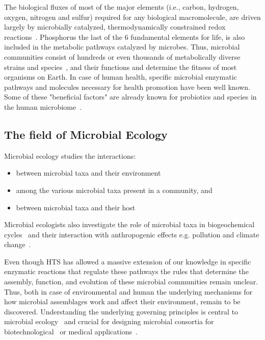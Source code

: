    The biological fluxes of most of the major elements (i.e., carbon, hydrogen, oxygen, nitrogen and sulfur) required
   for any biological macromolecule,
   are driven largely
   by microbially catalyzed, thermodynamically constrained redox reactions~\cite{falkowski2008microbial}. 
   Phosphorus the last of the 6 fundamental elements for life, is also included in the metabolic pathways catalyzed by microbes. 
   Thus, microbial communities consist of hundreds or even thousands of metabolically diverse strains and species~\cite{leventhal2018strain},
   and their functions
   and determine the fitness of most organisms on Earth. 
   In case of human health, specific microbial enzymatic pathways and molecules necessary for health promotion have been well known.
   Some of these "beneficial factors" are already known for probiotics and species in the human microbiome~\cite{marco2021defining}.


   \subsection{The field of Microbial Ecology}
   Microbial ecology studies the interactions: 
   \begin{itemize}
      \setlength\itemsep{0.05em}
      \item between microbial taxa and their environment
      \item among the various microbial taxa present in a community, and
      \item between microbial taxa and their host~\cite{isme}
   \end{itemize}

   Microbial ecologists also investigate the role of microbial taxa in 
   biogeochemical cycles~\cite{falkowski2008microbial} and their interaction 
   with anthropogenic effects e.g. pollution and climate change~\cite{cavicchioli2019scientists}.

   Even though HTS has allowed a massive extension of our knowledge in  
   specific enzymatic reactions that regulate these pathways the rules that determine 
   the assembly, function, and evolution of these microbial communities remain unclear. 
   Thus, both in case of environmental and human
   the underlying mechanisms for how microbial assemblages work and affect their environment, remain to be discovered.
   Understanding the underlying governing principles is central to microbial ecology~\cite{giri2021metabolic} and crucial for designing microbial consortia for biotechnological~\cite{giri2020harnessing} or medical applications~\cite{kong2018designing}.

